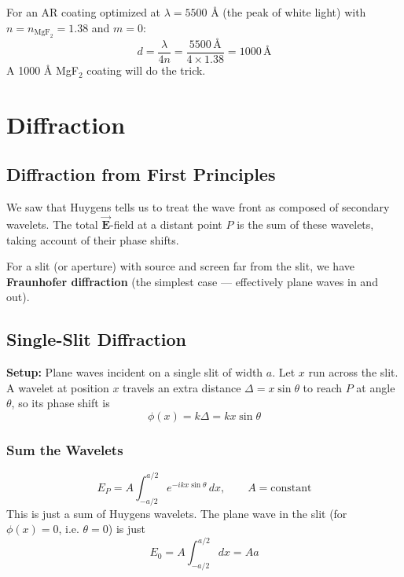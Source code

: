 \documentclass[11pt]{report}
\newcommand{\vbf}[1]{\vec{\mathbf{#1}}}
\begin{document}
For an AR coating optimized at $\lambda = 5500$ \AA{} (the peak of white light) with $n = n_{\text{MgF}_2} = 1.38$ and $m = 0$:
\begin{equation}
d = \frac{\lambda}{4n} = \frac{5500\,\text{\AA}}{4 \times 1.38} = 1000\,\text{\AA}
\end{equation}
A 1000 \AA{} MgF$_2$ coating will do the trick.


\newpage
\chapter{Diffraction}

\section{Diffraction from First Principles}

We saw that Huygens tells us to treat the wave front as composed of secondary wavelets. The total $\vbf{E}$-field at a distant point $P$ is the sum of these wavelets, taking account of their phase shifts.

For a slit (or aperture) with source and screen far from the slit, we have \textbf{Fraunhofer diffraction} (the simplest case --- effectively plane waves in and out).

\section{Single-Slit Diffraction}

\textbf{Setup:} Plane waves incident on a single slit of width $a$. Let $x$ run across the slit. A wavelet at position $x$ travels an extra distance $\Delta = x\sin\theta$ to reach $P$ at angle $\theta$, so its phase shift is
\begin{equation}
\phi(x) = k\Delta = kx\sin\theta
\end{equation}

\subsection*{Sum the Wavelets}

\begin{equation}
E_P = A \int_{-a/2}^{a/2} e^{-ikx\sin\theta}\,dx, \qquad A = \text{constant}
\end{equation}
This is just a sum of Huygens wavelets. The plane wave in the slit (for $\phi(x) = 0$, i.e. $\theta = 0$) is just
\begin{equation}
E_0 = A\int_{-a/2}^{a/2}dx = Aa
\end{equation}
\end{document}
